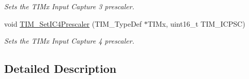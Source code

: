 \begin{DoxyCompactItemize}
\begin{DoxyCompactList}\small\item\em Sets the T\-I\-Mx Input Capture 3 prescaler. \end{DoxyCompactList}\item 
void \hyperlink{group___t_i_m___group3_ga0f2c784271356d6b64b8c0da64dbdbc2}{T\-I\-M\-\_\-\-Set\-I\-C4\-Prescaler} (T\-I\-M\-\_\-\-Type\-Def $\ast$T\-I\-Mx, uint16\-\_\-t T\-I\-M\-\_\-\-I\-C\-P\-S\-C)
\begin{DoxyCompactList}\small\item\em Sets the T\-I\-Mx Input Capture 4 prescaler. \end{DoxyCompactList}\end{DoxyCompactItemize}


\subsection{Detailed Description}
